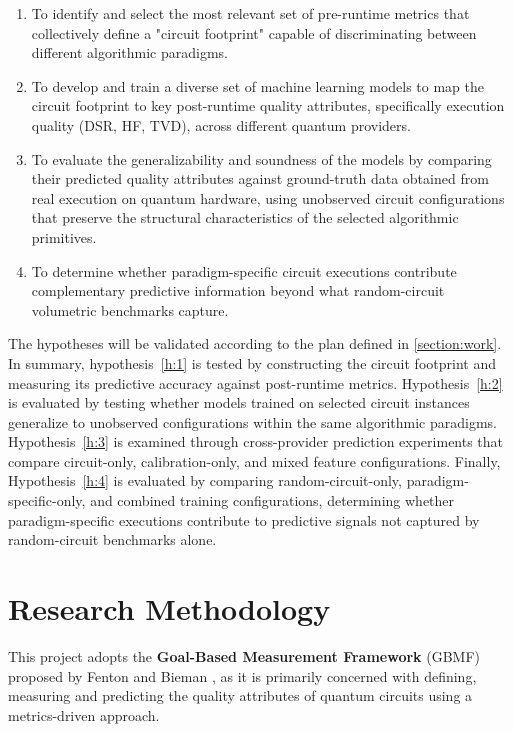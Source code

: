 \documentclass{article}
\begin{document}
\begin{enumerate}[label=O\arabic*, ref=O\arabic*, font=\bfseries]
\item To identify and select the most relevant set of pre-runtime metrics that collectively define a "circuit footprint" capable of discriminating between different algorithmic paradigms.
\label{o:1}

\item To develop and train a diverse set of machine learning models to map the circuit footprint to key post-runtime quality attributes, specifically execution quality (DSR, HF, TVD), across different quantum providers.
\label{o:2}

\item To evaluate the generalizability and soundness of the models by comparing their predicted quality attributes against ground-truth data obtained from real execution on quantum hardware, using unobserved circuit configurations that preserve the structural characteristics of the selected algorithmic primitives.
\label{o:3}

\item To determine whether paradigm-specific circuit executions contribute complementary predictive information beyond what random-circuit volumetric benchmarks capture.
\label{o:4}
\end{enumerate}

The hypotheses will be validated according to the plan defined in \ref{section:work}. In summary, hypothesis~\ref{h:1} is tested by constructing the circuit footprint and measuring its predictive accuracy against post-runtime metrics. Hypothesis~\ref{h:2} is evaluated by testing whether models trained on selected circuit instances generalize to unobserved configurations within the same algorithmic paradigms. Hypothesis~\ref{h:3} is examined through cross-provider prediction experiments that compare circuit-only, calibration-only, and mixed feature configurations. Finally, Hypothesis~\ref{h:4} is evaluated by comparing random-circuit-only, paradigm-specific-only, and combined training configurations, determining whether paradigm-specific executions contribute to predictive signals not captured by random-circuit benchmarks alone.

\section{Research Methodology}
\label{section:methodology}

This project adopts the \textbf{Goal-Based Measurement Framework} (GBMF) proposed by Fenton and Bieman \cite{alma991005387727907681_2015}, as it is primarily concerned with defining, measuring and predicting the quality attributes of quantum circuits using a metrics-driven approach.
\end{document}
